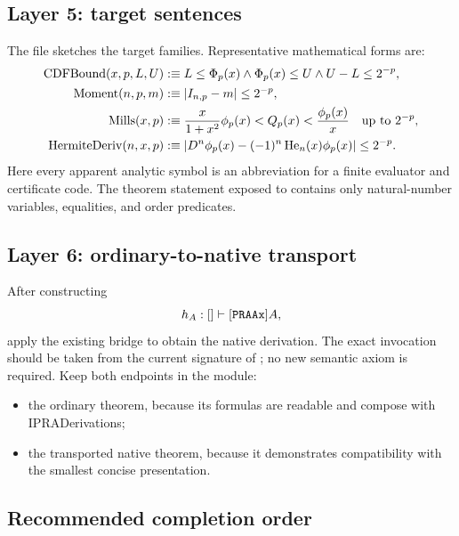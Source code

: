 \subsection{Layer 5: target sentences}

The file  sketches the target families.  Representative mathematical forms are:
\begin{align*}
 \operatorname{CDFBound}(x,p,L,U)
 &:\equiv L\le\Phi_p(x)\wedge\Phi_p(x)\le U\wedge U-L\le2^{-p},\\
 \operatorname{Moment}(n,p,m)
 &:\equiv |I_{n,p}-m|\le2^{-p},\\
 \operatorname{Mills}(x,p)
 &:\equiv \frac{x}{1+x^2}\phi_p(x)<Q_p(x)<\frac{\phi_p(x)}x
       \quad\text{up to }2^{-p},\\
 \operatorname{HermiteDeriv}(n,x,p)
 &:\equiv |D^n\phi_p(x)-(-1)^n\operatorname{He}_n(x)\phi_p(x)|\le2^{-p}.
\end{align*}
Here every apparent analytic symbol is an abbreviation for a finite evaluator and certificate code.  The theorem statement exposed to  contains only natural-number variables, equalities, and order predicates.

\subsection{Layer 6: ordinary-to-native transport}

After constructing
\[
 h_A : []\vdash[\code{PRAAx}]A,
\]
apply the existing bridge to obtain the native derivation.  The exact invocation should be taken from the current signature of ; no new semantic axiom is required.  Keep both endpoints in the module:
\begin{itemize}
  \item the ordinary theorem, because its formulas are readable and compose with IPRADerivations;
  \item the transported native theorem, because it demonstrates compatibility with the smallest concise presentation.
\end{itemize}

\subsection{Recommended completion order}

